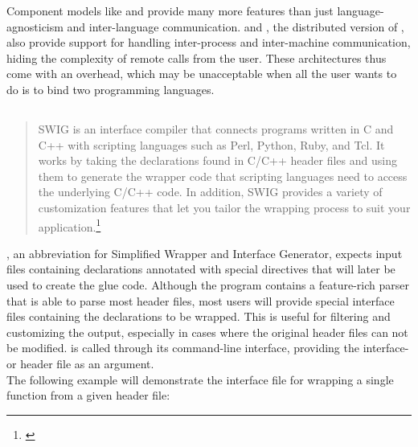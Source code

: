 
Component models like  and  provide many more features than just language-agnosticism and inter-language communication.  and , the distributed version of , also provide support for handling inter-process and inter-machine communication, hiding the complexity of remote calls from the user. These architectures thus come with an overhead, which may be unacceptable when all the user wants to do is to bind two programming languages.


\newpage
\subsection{}

\begin{quotation}
SWIG is an interface compiler that connects programs written in C and C++ with scripting languages such as Perl, Python, Ruby, and Tcl. It works by taking the declarations found in C/C++ header files and using them to generate the wrapper code that scripting languages need to access the underlying C/C++ code. In addition, SWIG provides a variety of customization features that let you tailor the wrapping process to suit your application.\footnote{\citep{SWIGHPExec}}
\end{quotation}


, an abbreviation for Simplified Wrapper and Interface Generator, expects input files containing  declarations annotated with special  directives that will later be used to create the glue code. Although the program contains a feature-rich  parser that is able to parse most  header files, most users will provide special  interface files containing the declarations to be wrapped. This is useful for filtering and customizing the output, especially in cases where the original header files can not be modified.  is called through its command-line interface, providing the interface- or header file as an argument.
\\The following example will demonstrate the interface file for wrapping a single function from a given header file:

